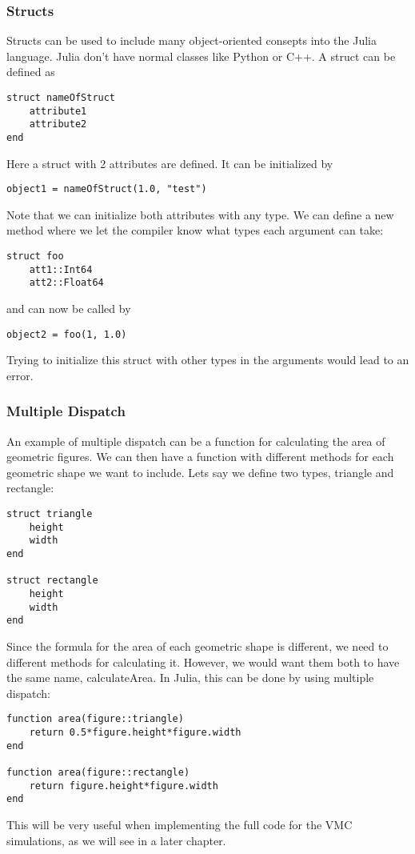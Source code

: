 \subsubsection{Structs}
Structs can be used to include many object-oriented consepts into the Julia language. Julia don't have normal classes like Python or C++. A struct can be defined as
\begin{lstlisting}
struct nameOfStruct
    attribute1
    attribute2
end
\end{lstlisting}
Here a struct with 2 attributes are defined. It can be initialized by 
\begin{lstlisting}
object1 = nameOfStruct(1.0, "test")
\end{lstlisting}
Note that we can initialize both attributes with any type. We can define a new method where we let the compiler know what types each argument can take:
\begin{lstlisting}
struct foo
    att1::Int64
    att2::Float64
\end{lstlisting}
and can now be called by
\begin{lstlisting}
object2 = foo(1, 1.0)
\end{lstlisting}
Trying to initialize this struct with other types in the arguments would lead to an error. 
\subsubsection{Multiple Dispatch}
An example of multiple dispatch can be a function for calculating the area of geometric figures. We can then have a function with different methods for each geometric shape we want to include. Lets say we define two types, triangle and rectangle:
\begin{lstlisting}
struct triangle
    height
    width
end 

struct rectangle
    height
    width
end
\end{lstlisting}
Since the formula for the area of each geometric shape is different, we need to different methods for calculating it. However, we would want them both to have the same name, calculateArea. In Julia, this can be done by using multiple dispatch:
\begin{lstlisting}
function area(figure::triangle)
    return 0.5*figure.height*figure.width
end

function area(figure::rectangle)
    return figure.height*figure.width
end
\end{lstlisting}
This will be very useful when implementing the full code for the VMC simulations, as we will see in a later chapter. 

